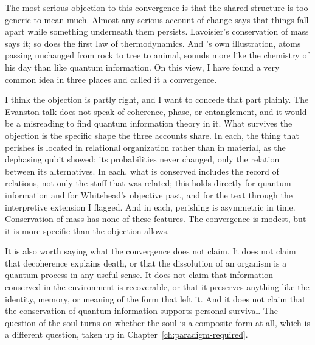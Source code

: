 The most serious objection to this convergence is that the shared structure is too generic to mean much.
Almost any serious account of change says that things fall apart while something underneath them persists.
Lavoisier's conservation of mass says it; so does the first law of thermodynamics.
And \AbdulBaha's own illustration, atoms passing unchanged from rock to tree to animal, sounds more like the chemistry of his day than like quantum information.
On this view, I have found a very common idea in three places and called it a convergence.

I think the objection is partly right, and I want to concede that part plainly.
The Evanston talk does not speak of coherence, phase, or entanglement, and it would be a misreading to find quantum information theory in it.
What survives the objection is the specific shape the three accounts share.
In each, the thing that perishes is located in relational organization rather than in material, as the dephasing qubit showed: its probabilities never changed, only the relation between its alternatives.
In each, what is conserved includes the record of relations, not only the stuff that was related; this holds directly for quantum information and for Whitehead's objective past, and for the \bahai text through the interpretive extension I flagged.
And in each, perishing is asymmetric in time.
Conservation of mass has none of these features.
The convergence is modest, but it is more specific than the objection allows.

It is also worth saying what the convergence does not claim.
It does not claim that decoherence explains death, or that the dissolution of an organism is a quantum process in any useful sense.
It does not claim that information conserved in the environment is recoverable, or that it preserves anything like the identity, memory, or meaning of the form that left it.
And it does not claim that the conservation of quantum information supports personal survival.
The question of the soul turns on whether the soul is a composite form at all, which is a different question, taken up in Chapter~\ref{ch:paradigm-required}.

